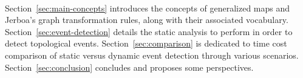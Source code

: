 ~

Section~\ref{sec:main-concepts} introduces the concepts of generalized maps and Jerboa's graph transformation rules, along with their associated vocabulary.
Section~\ref{sec:event-detection} details the static analysis to perform in order to detect topological events.
Section~\ref{sec:comparison} is dedicated to time cost comparison of static versus dynamic event detection through various scenarios.
Section~\ref{sec:conclusion} concludes and proposes some perspectives.

